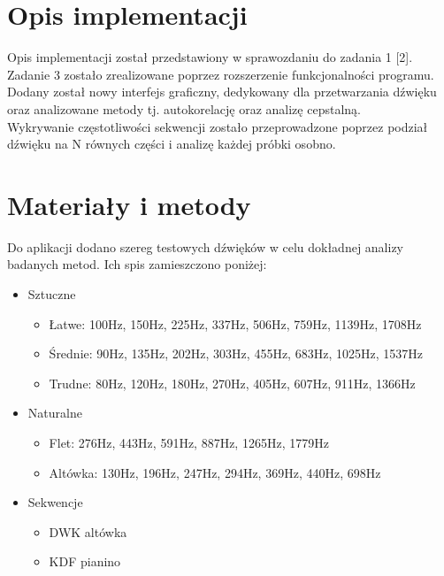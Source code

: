 \documentclass{classrep}
\begin{document}
\section{Opis implementacji}
Opis implementacji został przedstawiony w sprawozdaniu do zadania 1 [2]. Zadanie 3 zostało zrealizowane poprzez rozszerzenie funkcjonalności programu. Dodany został nowy interfejs graficzny, dedykowany dla przetwarzania dźwięku oraz analizowane metody tj. autokorelację oraz analizę cepstalną.\\
\indent 
Wykrywanie częstotliwości sekwencji zostało przeprowadzone poprzez podział dźwięku na N równych części i analizę każdej próbki osobno.

\section{Materiały i metody}
Do aplikacji dodano szereg testowych dźwięków w celu dokładnej analizy badanych metod. Ich spis zamieszczono poniżej:\\
\indent
\begin{itemize}
\item Sztuczne
\begin{itemize}
\item Łatwe: 100Hz, 150Hz, 225Hz, 337Hz, 506Hz, 759Hz, 1139Hz, 1708Hz
\item Średnie: 90Hz, 135Hz, 202Hz, 303Hz, 455Hz, 683Hz, 1025Hz, 1537Hz
\item Trudne: 80Hz, 120Hz, 180Hz, 270Hz, 405Hz, 607Hz, 911Hz, 1366Hz
\end{itemize}
\item Naturalne
\begin{itemize}
\item Flet: 276Hz, 443Hz, 591Hz, 887Hz, 1265Hz, 1779Hz
\item Altówka: 130Hz, 196Hz, 247Hz, 294Hz, 369Hz, 440Hz, 698Hz
\end{itemize}
\item Sekwencje
\begin{itemize}
\item DWK altówka
\item KDF pianino
\end{itemize}
\end{itemize}
\end{document}
